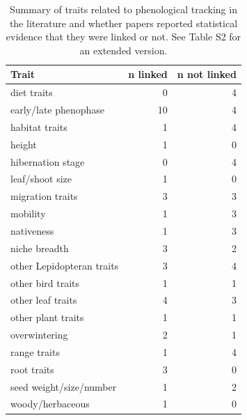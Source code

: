 \documentclass[11pt,letter]{article}
\begin{document}
 \newpage
\begin{table}[ht]
\centering
\caption{Summary of traits related to phenological tracking in the literature and whether papers reported statistical evidence that they were linked or not. See Table S2 for an extended version.} 
\label{tab:meta1}
\begingroup\footnotesize
\begin{tabular}{lrr}
  \hline
Trait & n linked & n not linked \\ 
  \hline
diet traits &   0 &   4 \\ 
  early/late phenophase &  10 &   4 \\ 
  habitat traits &   1 &   4 \\ 
  height &   1 &   0 \\ 
  hibernation stage &   0 &   4 \\ 
  leaf/shoot size &   1 &   0 \\ 
  migration traits &   3 &   3 \\ 
  mobility &   1 &   3 \\ 
  nativeness &   1 &   3 \\ 
  niche breadth &   3 &   2 \\ 
  other Lepidopteran traits &   3 &   4 \\ 
  other bird traits &   1 &   1 \\ 
  other leaf traits &   4 &   3 \\ 
  other plant traits &   1 &   1 \\ 
  overwintering &   2 &   1 \\ 
  range traits &   1 &   4 \\ 
  root traits &   3 &   0 \\ 
  seed weight/size/number &   1 &   2 \\ 
  woody/herbaceous &   1 &   0 \\ 
   \hline
\end{tabular}
\endgroup
\end{table}%
\end{document}
